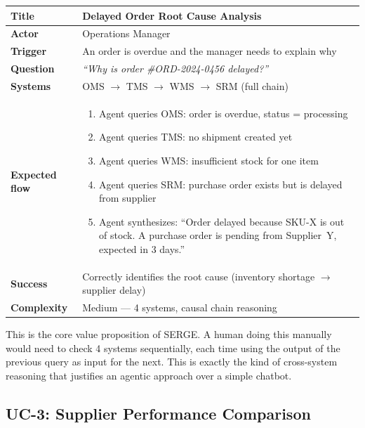 \documentclass[11pt,a4paper]{article}
\begin{document}
\begin{table}[H]
\centering\small
\begin{tabularx}{\textwidth}{@{} l X @{}}
\toprule
\textbf{Title}       & Delayed Order Root Cause Analysis \\
\midrule
\textbf{Actor}       & Operations Manager \\
\textbf{Trigger}     & An order is overdue and the manager needs to explain why \\
\textbf{Question}    & \textit{``Why is order \#ORD-2024-0456 delayed?''} \\
\textbf{Systems}     & OMS $\to$ TMS $\to$ WMS $\to$ SRM (full chain) \\
\textbf{Expected flow} &
    \begin{enumerate}[nosep,leftmargin=1.2em]
        \item Agent queries OMS: order is overdue, status = processing
        \item Agent queries TMS: no shipment created yet
        \item Agent queries WMS: insufficient stock for one item
        \item Agent queries SRM: purchase order exists but is delayed from supplier
        \item Agent synthesizes: ``Order delayed because SKU-X is out of stock. A purchase order is pending from Supplier~Y, expected in 3 days.''
    \end{enumerate} \\
\textbf{Success}     & Correctly identifies the root cause (inventory shortage $\to$ supplier delay) \\
\textbf{Complexity}  & Medium --- 4 systems, causal chain reasoning \\
\bottomrule
\end{tabularx}
\end{table}

\begin{notebox}
This is the core value proposition of SERGE. A human doing this manually would need to check 4 systems sequentially, each time using the output of the previous query as input for the next. This is exactly the kind of cross-system reasoning that justifies an agentic approach over a simple chatbot.
\end{notebox}

\subsection{UC-3: Supplier Performance Comparison}
\end{document}
